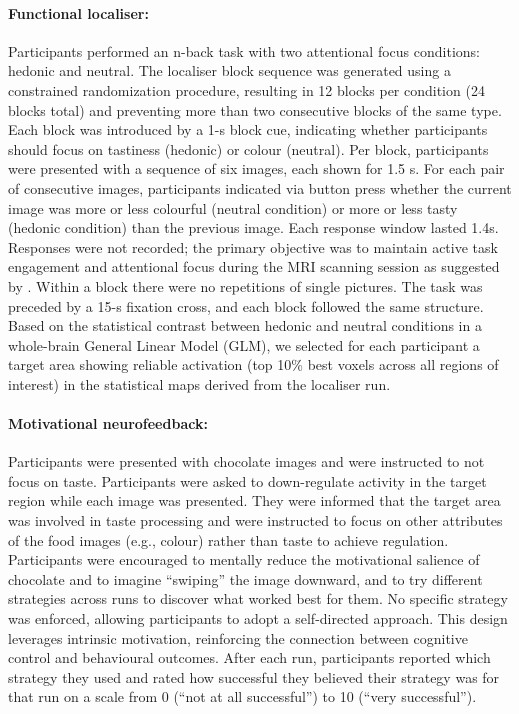 \documentclass[]{imag-ms-template}
\begin{document}
\paragraph{Functional localiser:} Participants performed an n-back task with two attentional focus conditions: hedonic and neutral. The localiser block sequence was generated using a constrained randomization procedure, resulting in 12 blocks per condition (24 blocks total) and preventing more than two consecutive blocks of the same type. Each block was introduced by a 1-s block cue, indicating whether participants should focus on tastiness (hedonic) or colour (neutral). Per block, participants were presented with a sequence of six images, each shown for 1.5 s. For each pair of consecutive images, participants indicated via button press whether the current image was more or less colourful (neutral condition) or more or less tasty (hedonic condition) than the previous image. Each response window lasted 1.4s. Responses were not recorded; the primary objective was to maintain active task engagement and attentional focus during the MRI scanning session as suggested by \cite{kochsItMatterPerspective2023}. Within a block there were no repetitions of single pictures. The task was preceded by a 15-s fixation cross, and each block followed the same structure. Based on the statistical contrast between hedonic and neutral conditions in a whole-brain General Linear Model (GLM), we selected for each participant a target area showing reliable activation (top 10\% best voxels across all regions of interest) in the statistical maps derived from the localiser run.

\paragraph{Motivational neurofeedback:} Participants were  presented with chocolate images and were instructed to not focus on taste. Participants were asked to down-regulate activity in the target region while each image was presented. They were informed that the target area was involved in taste processing and were instructed to focus on other attributes of the food images (e.g., colour) rather than taste to achieve regulation. Participants were encouraged to mentally reduce the motivational salience of chocolate and to imagine “swiping” the image downward, and to try different strategies across runs to discover what worked best for them. No specific strategy was enforced, allowing participants to adopt a self-directed approach. This design leverages intrinsic motivation, reinforcing the connection between cognitive control and behavioural outcomes. After each run, participants reported which strategy they used and rated how successful they believed their strategy was for that run on a scale from 0 (“not at all successful”) to 10 (“very successful”).
\end{document}
